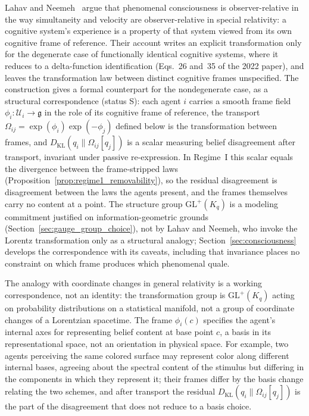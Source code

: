 \documentclass[11pt]{article}
\begin{document}
Lahav and Neemeh~\cite{LahavNeemeh2022, LahavNeemeh2025} argue that phenomenal consciousness is observer-relative in the way simultaneity and velocity are observer-relative in special relativity: a cognitive system's experience is a property of that system viewed from its own cognitive frame of reference. Their account writes an explicit transformation only for the degenerate case of functionally identical cognitive systems, where it reduces to a delta-function identification (Eqs.~26 and~35 of the 2022 paper), and leaves the transformation law between distinct cognitive frames unspecified. The construction gives a formal counterpart for the nondegenerate case, as a structural correspondence (status S): each agent $i$ carries a smooth frame field $\phi_i: \mathcal{U}_i \to \mathfrak{g}$ in the role of its cognitive frame of reference, the transport $\Omega_{ij} = \exp(\phi_i)\exp(-\phi_j)$ defined below is the transformation between frames, and $D_{\mathrm{KL}}(q_i \| \Omega_{ij}[q_j])$ is a scalar measuring belief disagreement after transport, invariant under passive re-expression. In Regime~I this scalar equals the divergence between the frame-stripped laws (Proposition~\ref{prop:regime1_removability}), so the residual disagreement is disagreement between the laws the agents present, and the frames themselves carry no content at a point. The structure group $\mathrm{GL}^+(K_q)$ is a modeling commitment justified on information-geometric grounds (Section~\ref{sec:gauge_group_choice}), not by Lahav and Neemeh, who invoke the Lorentz transformation only as a structural analogy; Section~\ref{sec:consciousness} develops the correspondence with its caveats, including that invariance places no constraint on which frame produces which phenomenal quale.

The analogy with coordinate changes in general relativity is a working correspondence, not an identity: the transformation group is $\mathrm{GL}^+(K_q)$ acting on probability distributions on a statistical manifold, not a group of coordinate changes of a Lorentzian spacetime. The frame $\phi_i(c)$ specifies the agent's internal axes for representing belief content at base point $c$, a basis in its representational space, not an orientation in physical space. For example, two agents perceiving the same colored surface may represent color along different internal bases, agreeing about the spectral content of the stimulus but differing in the components in which they represent it; their frames differ by the basis change relating the two schemes, and after transport the residual $D_{\mathrm{KL}}(q_i \| \Omega_{ij}[q_j])$ is the part of the disagreement that does not reduce to a basis choice.
\end{document}
